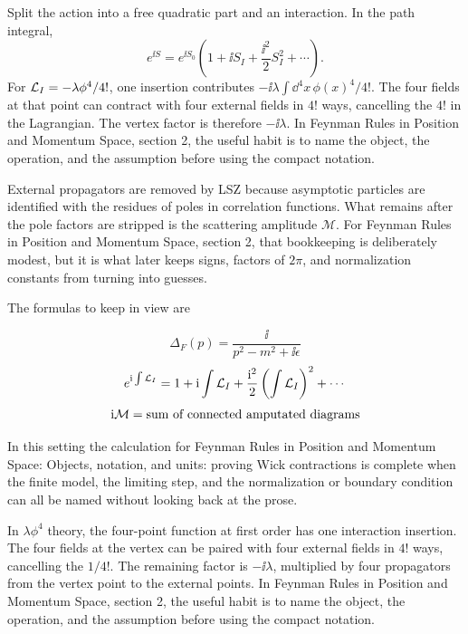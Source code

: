 Split the action into a free quadratic part and an interaction.  In the path integral,
\[
  e^{\ii S}=e^{\ii S_0}\left(1+\ii S_I+\frac{\ii^2}{2}S_I^2+\cdots\right).
\]
For \(\mathcal L_I=-\lambda\phi^4/4!\), one insertion contributes \(-\ii\lambda\int\dd^4x\,\phi(x)^4/4!\).  The four fields at that point can contract with four external fields in \(4!\) ways, cancelling the \(4!\) in the Lagrangian.  The vertex factor is therefore \(-\ii\lambda\).  In Feynman Rules in Position and Momentum Space, section 2, the useful habit is to name the object, the operation, and the assumption before using the compact notation.

External propagators are removed by LSZ because asymptotic particles are identified with the residues of poles in correlation functions.  What remains after the pole factors are stripped is the scattering amplitude \(\mathcal M\).  For Feynman Rules in Position and Momentum Space, section 2, that bookkeeping is deliberately modest, but it is what later keeps signs, factors of \(2\pi\), and normalization constants from turning into guesses.

The formulas to keep in view are

\[
  \Delta_F(p)=\frac{\ii}{p^2-m^2+\ii\epsilon}
\]
\[
  e^{\mathrm i\int\mathcal L_I}=1+\mathrm i\int\mathcal L_I+\frac{\mathrm i^2}{2}\left(\int\mathcal L_I\right)^2+\cdots
\]
\[
  \mathrm i\mathcal M=\hbox{sum of connected amputated diagrams}
\]

In this setting the calculation for Feynman Rules in Position and Momentum Space: Objects, notation, and units: proving Wick contractions is complete when the finite model, the limiting step, and the normalization or boundary condition can all be named without looking back at the prose.




\begin{example}
In \(\lambda\phi^4\) theory, the four-point function at first order has one interaction insertion.  The four fields at the vertex can be paired with four external fields in \(4!\) ways, cancelling the \(1/4!\).  The remaining factor is \(-\ii\lambda\), multiplied by four propagators from the vertex point to the external points.  In Feynman Rules in Position and Momentum Space, section 2, the useful habit is to name the object, the operation, and the assumption before using the compact notation.
\end{example}



